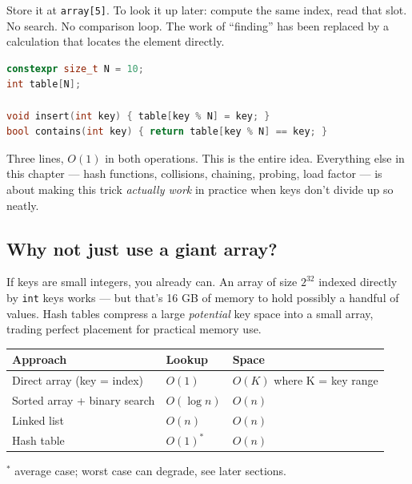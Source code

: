 \documentclass[11pt]{article}
\begin{document}
Store it at \texttt{array[5]}. To look it up later: compute the
same index, read that slot. No search. No comparison loop. The
work of ``finding'' has been replaced by a calculation that
locates the element directly.

\begin{examplebox}
\begin{lstlisting}[language=C++,basicstyle=\ttfamily\small,frame=single]
constexpr size_t N = 10;
int table[N];

void insert(int key) { table[key % N] = key; }
bool contains(int key) { return table[key % N] == key; }
\end{lstlisting}
\end{examplebox}

Three lines, $O(1)$ in both operations. This is the entire idea.
Everything else in this chapter --- hash functions, collisions,
chaining, probing, load factor --- is about making this trick
\emph{actually work} in practice when keys don't divide up so
neatly.

\subsection*{Why not just use a giant array?}

If keys are small integers, you already can. An array of size
$2^{32}$ indexed directly by \texttt{int} keys works --- but
that's 16 GB of memory to hold possibly a handful of values.
Hash tables compress a large \emph{potential} key space into a
small array, trading perfect placement for practical memory use.

\begin{center}
\begin{tabular}{|l|l|l|}
\hline
\textbf{Approach} & \textbf{Lookup} & \textbf{Space} \\
\hline
Direct array (key = index)       & $O(1)$ & $O(K)$ where K = key range \\
Sorted array + binary search     & $O(\log n)$ & $O(n)$ \\
Linked list                      & $O(n)$ & $O(n)$ \\
Hash table                       & $O(1)^*$ & $O(n)$ \\
\hline
\end{tabular}
\end{center}

\noindent $^*$ average case; worst case can degrade, see later sections.
\end{document}
